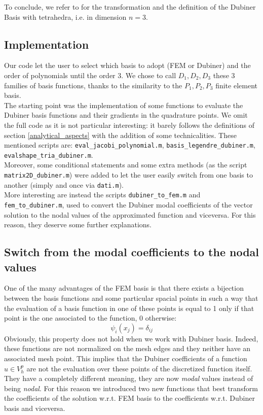 \documentclass[a4paper,11pt]{article}
\begin{document}
    \noindent To conclude, we refer to \cite{sherwin} for the transformation and the definition of the Dubiner Basis with tetrahedra, i.e. in dimension $n=3$.
    
    \subsection{Implementation}\label{subsection_implementation}
    Our code let the user to select which basis to adopt (FEM or Dubiner) and the order of polynomials until the order 3. We chose to call $D_1,D_2,D_3$ these 3 families of basis functions, thanks to the similarity to the $P_1,P_2,P_3$ finite element basis.\\
    The starting point was the implementation of some functions to evaluate the Dubiner basis functions and their gradients in the quadrature points. We omit the full code as it is not particular interesting: it barely follows the definitions of section \ref{analytical_aspects} with the addition of some technicalities. These mentioned scripts are: \texttt{eval\_jacobi\_polynomial.m}, \texttt{basis\_legendre\_dubiner.m}, \texttt{evalshape\_tria\_dubiner.m}.\\
    
    \noindent Moreover, some conditional statements and some extra methods (as the script \texttt{matrix2D\_dubiner.m}) were added to let the user easily switch from one basis to another (simply and once via \texttt{dati.m}). \\
    
    \noindent More interesting are instead the scripts \texttt{dubiner\_to\_fem.m} and \texttt{fem\_to\_dubiner.m}, used to convert the Dubiner modal coefficients of the vector solution to the nodal values of the approximated function and viceversa. For this reason, they deserve some further explanations.
\subsection{Switch from the modal coefficients to the nodal values}
One of the many advantages of the FEM basis is that there exists a bijection between the basis functions and some particular spacial points in such a way that the evaluation of a basis function in one of these points is equal to 1 only if that point is the one associated to the function, 0 otherwise:
	\begin{equation} \label{ref1}
	\psi_i(x_j)=\delta_{ij}
	\end{equation}
	Obviously, this property does not hold when we work with Dubiner basis. Indeed, these functions are not normalized on the mesh edges and they neither have an associated mesh point. This implies that the Dubiner coefficients of a function $u\in V_h^p$ are not the evaluation over these points of the discretized function itself. They have a completely different meaning, they are now \emph{modal} values instead of being \emph{nodal}.
	For this reason we introduced two new functions that best transform the coefficients of the solution w.r.t. FEM basis to the coefficients w.r.t. Dubiner basis and viceversa.\vspace{5mm}
	
\end{document}
